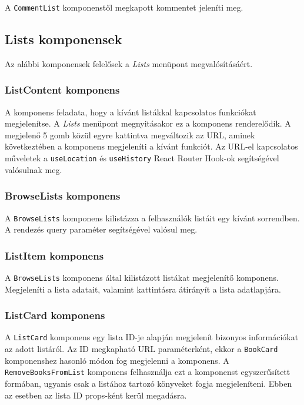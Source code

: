 A \texttt{CommentList} komponenstől megkapott kommentet jeleníti meg.

\subsection{Lists komponensek}

Az alábbi komponensek felelősek a \textit{Lists} menüpont megvalósításáért.

\subsubsection{ListContent komponens}

A komponens feladata, hogy a kívánt listákkal kapcsolatos funkciókat megjelenítse. A \textit{Lists} menüpont megnyitásakor ez a komponens renderelődik. A megjelenő 5 gomb közül egyre kattintva megváltozik az URL, aminek következtében a komponens megjeleníti a kívánt funkciót. Az URL-el kapcsolatos műveletek a \texttt{useLocation} és \texttt{useHistory} React Router Hook-ok segítségével valósulnak meg.

\subsubsection{BrowseLists komponens}

A \texttt{BrowseLists} komponens kilistázza a felhasználók listáit egy kívánt sorrendben. A rendezés query paraméter segítségével valósul meg.

\subsubsection{ListItem komponens}

A \texttt{BrowseLists} komponens által kilistázott listákat megjelenítő komponens. Megjeleníti a lista adatait, valamint kattintásra átirányít a lista adatlapjára.

\subsubsection{ListCard komponens}

A \texttt{ListCard} komponens egy lista ID-je alapján megjelenít bizonyos információkat az adott listáról. Az ID  megkapható URL paraméterként, ekkor a \texttt{BookCard} komponenshez hasonló módon fog megjelenni a komponens. A \texttt{RemoveBooksFromList} komponens felhasználja ezt a komponenst egyszerűsített formában, ugyanis csak a listához tartozó könyveket fogja megjeleníteni. Ebben az esetben az lista ID props-ként kerül megadásra.

